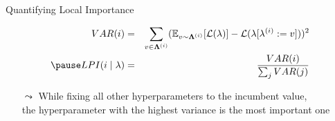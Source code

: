 \begin{frame}[c]{Quantifying Local Importance }

\begin{eqnarray}
VAR(i)  &=& \sum_{v \in \pcs^{(i)}} (\mathbb{E}_{v \sim \pcs^{(i)}}[\loss(\conf) ] - \loss(\conf[ \conf^{(i)} := v]))^2\\
\pause
LPI( i  \mid \conf ) &=& \frac{VAR(i) }{ \sum_{j}  VAR(j)}
\end{eqnarray}

\bigskip
\pause

\begin{itemize}
	\item[$\leadsto$] While fixing all other hyperparameters to the incumbent value,\\ the hyperparameter with the highest variance  is the most important one
\end{itemize}

\end{frame}

